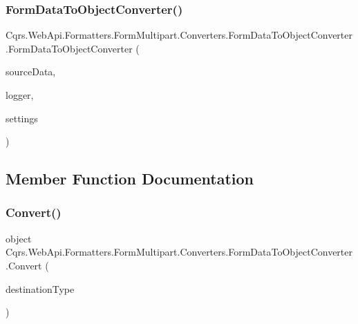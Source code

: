 \subsubsection{\texorpdfstring{Form\+Data\+To\+Object\+Converter()}{FormDataToObjectConverter()}}
{\footnotesize\ttfamily Cqrs.\+Web\+Api.\+Formatters.\+Form\+Multipart.\+Converters.\+Form\+Data\+To\+Object\+Converter.\+Form\+Data\+To\+Object\+Converter (\begin{DoxyParamCaption}\item[{\hyperlink{classCqrs_1_1WebApi_1_1Formatters_1_1FormMultipart_1_1Infrastructure_1_1FormData}{Form\+Data}}]{source\+Data,  }\item[{\hyperlink{interfaceCqrs_1_1WebApi_1_1Formatters_1_1FormMultipart_1_1Infrastructure_1_1Logger_1_1IFormDataConverterLogger}{I\+Form\+Data\+Converter\+Logger}}]{logger,  }\item[{\hyperlink{classCqrs_1_1WebApi_1_1Formatters_1_1FormMultipart_1_1Infrastructure_1_1MultipartFormatterSettings}{Multipart\+Formatter\+Settings}}]{settings }\end{DoxyParamCaption})}



\subsection{Member Function Documentation}
\mbox{\label{classCqrs_1_1WebApi_1_1Formatters_1_1FormMultipart_1_1Converters_1_1FormDataToObjectConverter_a1b3d45a20f48b1608a6a68796610c5aa}} 
\subsubsection{\texorpdfstring{Convert()}{Convert()}}
{\footnotesize\ttfamily object Cqrs.\+Web\+Api.\+Formatters.\+Form\+Multipart.\+Converters.\+Form\+Data\+To\+Object\+Converter.\+Convert (\begin{DoxyParamCaption}\item[{Type}]{destination\+Type }\end{DoxyParamCaption})}

